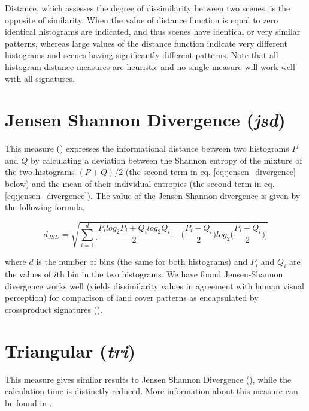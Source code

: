 Distance, which assesses the degree of dissimilarity between two scenes, is the opposite of similarity. 
When the value of distance function is equal to zero identical histograms are indicated, and thus scenes have identical or very similar patterns, whereas large values of the distance function indicate very different histograms and scenes having significantly different patterns. 
Note that all histogram distance measures are heuristic and no single measure will work well with all signatures.

\section{Jensen Shannon Divergence ({\it jsd})}

This measure (\cite{Lin1991}) expresses the informational distance between two histograms $P$ and $Q$ by calculating a deviation between the Shannon entropy of the mixture of the two histograms $(P+Q)/2$ (the second term in eq. \ref{eq:jensen_divergence} below) and the mean of their individual entropies (the second term in eq. \ref{eq:jensen_divergence}).
The value of the Jensen-Shannon divergence is given by the following formula,

\begingroup
\scriptsize
\begin{equation} \label{eq:jensen_divergence}
d_{JSD}=\sqrt{\sum\limits_{i=1}^{d}{ 
\biggl[\dfrac{P_{i} log_{2} P_{i}+Q_{i} log_{2} Q_{i}}{2}
-\biggl(\dfrac{P_{i}+Q_{i}}{2} \biggr)log_{2} \biggl(\dfrac{P_{i}+Q_{i}}{2} \biggr)\biggr]}}
\end{equation}
\endgroup

\noindent where $d$ is the number of bins (the same for both histograms) and $P_i$ and $Q_i$ are the values of $i$th bin in the two histograms. 
We have found Jensen-Shannon divergence works well (yields dissimilarity values in agreement with human visual perception) for comparison of land cover patterns as encapsulated by crossproduct signatures (\cite{Jasiewicz2013b,Stepinski2014JSTARS,Netzel2015}).

\section{Triangular ({\it tri})}
 
This measure gives similar results to Jensen Shannon Divergence (\cite{connor2016tale}), while the calculation time is distinctly reduced.
More information about this measure can be found in \cite{connor2016tale}.

